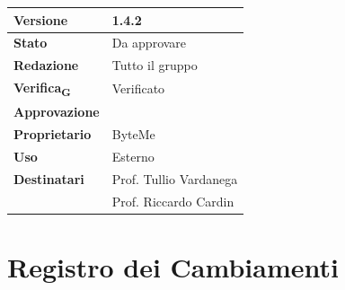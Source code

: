 \documentclass[11pt,a4paper]{article}
\newcommand{\gls}[1]{#1\textsubscript{G}}
\begin{document}
\begin{titlepage}
    \begin{table}[H]
        \centering
        \begin{tabular}{|l|p{5cm}|}
            \hline
            \textbf{Versione} & 1.4.2 \\
            \hline
            \textbf{Stato} & Da approvare \\
            \hline
            \textbf{Redazione} & Tutto il gruppo \\
            \hline
            \textbf{\gls{Verifica}} & Verificato \\
            \hline
            \textbf{Approvazione} & \\
            \hline
            \textbf{Proprietario} & ByteMe \\
            \hline
            \textbf{Uso} & Esterno \\
            \hline
            \textbf{Destinatari} & Prof. Tullio Vardanega \\ & Prof. Riccardo Cardin \\
            \hline
        \end{tabular}
    \end{table}
    
    \vfill
\end{titlepage}

\thispagestyle{empty}
\section*{Registro dei Cambiamenti}
\end{document}
